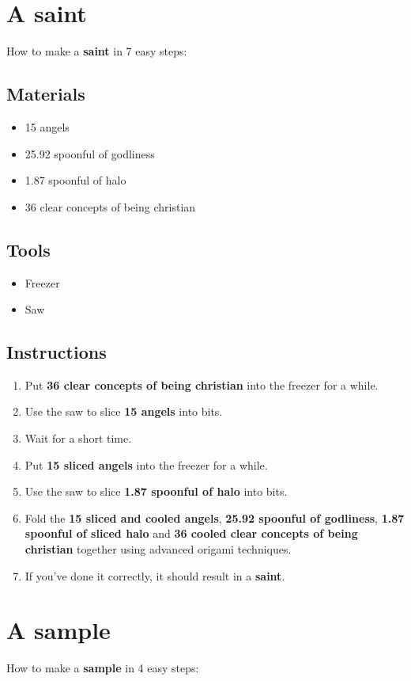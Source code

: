 \documentclass{article}
\begin{document}
\section{A saint}How to make a \textbf{saint} in 7 easy steps:

\subsection{Materials}\begin{itemize}
\item 
15 angels
\item 
25.92 spoonful of godliness
\item 
1.87 spoonful of halo
\item 
36 clear concepts of being christian
\end{itemize}
\subsection{Tools}\begin{itemize}
\item 
Freezer
\item 
Saw
\end{itemize}
\subsection{Instructions}\begin{enumerate}
\item 
Put \textbf{36 clear concepts of being christian} into the freezer for a while.
\item 
Use the saw to slice \textbf{15 angels} into bits.
\item 
Wait for a short time.
\item 
Put \textbf{15 sliced angels} into the freezer for a while.
\item 
Use the saw to slice \textbf{1.87 spoonful of halo} into bits.
\item 
Fold the \textbf{15 sliced and cooled angels}, \textbf{25.92 spoonful of godliness}, \textbf{1.87 spoonful of sliced halo} and \textbf{36 cooled clear concepts of being christian} together using advanced origami techniques.
\item 
If you've done it correctly, it should result in a \textbf{saint}.
\end{enumerate}
\newpage
\section{A sample}How to make a \textbf{sample} in 4 easy steps:
\end{document}
